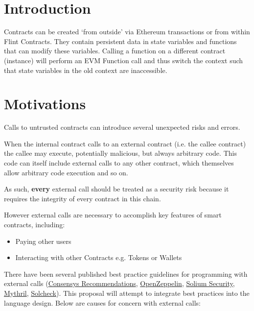 \section{Introduction}

Contracts can be created `from outside' via Ethereum transactions or from within Flint Contracts. They contain persistent data in state variables and functions that can modify these variables. Calling a function on a different contract (instance) will perform an EVM Function call and thus switch the context such that state variables in the old context are inaccessible.

\section{Motivations}

Calls to untrusted contracts can introduce several unexpected risks and errors.

When the internal contract calls to an external contract (i.e. the callee contract) the callee may execute, potentially malicious, but always arbitrary code. This code can itself include external calls to any other contract, which themselves allow arbitrary code execution and so on.

As such, \textbf{every} external call should be treated as a security risk because it requires the integrity of every contract in this chain.

However external calls are necessary to accomplish key features of smart contracts, including:

\begin{itemize}
	\item Paying other users
	\item Interacting with other Contracts e.g. Tokens or Wallets
\end{itemize}

There have been several published best practice guidelines for programming with external calls (\href{https://consensys.github.io/smart-contract-best-practices/recommendations/#favor-pull-over-push-for-external-calls}{Consensys Recommendations}, \href{http://openzeppelin.org/}{OpenZeppelin}, \href{https://github.com/duaraghav8/solium-plugin-security}{Solium Security}, \href{https://github.com/ConsenSys/mythril}{Mythril}, \href{https://github.com/federicobond/solcheck}{Solcheck}). This proposal will attempt to integrate best practices into the language design. Below are causes for concern with external calls:

